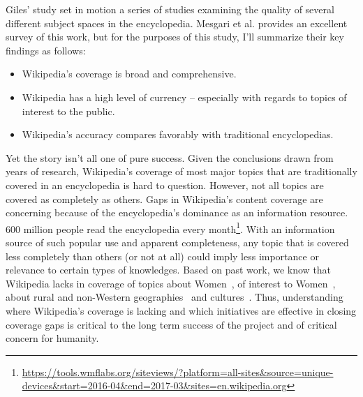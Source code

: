 Giles' study set in motion a series of studies examining the quality of several different subject spaces in the encyclopedia.  Mesgari et al. provides an excellent survey of this work\cite{mesgari15sum}, but for the purposes of this study, I'll summarize their key findings as follows:

\begin{itemize}
\item Wikipedia's coverage is broad and comprehensive.
\item Wikipedia has a high level of currency -- especially with regards to topics of interest to the public.
\item Wikipedia's accuracy compares favorably with traditional encyclopedias.
\end{itemize}

Yet the story isn't all one of pure success.  Given the conclusions drawn from years of research, Wikipedia's coverage of most major topics that are traditionally covered in an encyclopedia is hard to question.  However, not all topics are covered as completely as others.  Gaps in Wikipedia's content coverage are concerning because of the encyclopedia's dominance as an information resource.  600 million people read the encyclopedia every month\footnote{\url{https://tools.wmflabs.org/siteviews/?platform=all-sites&source=unique-devices&start=2016-04&end=2017-03&sites=en.wikipedia.org}}.  With an information source of such popular use and apparent completeness, any topic that is covered less completely than others (or not at all) could imply less importance or relevance to certain types of knowledges.  Based on past work, we know that Wikipedia lacks in coverage of topics about Women~\cite{reagle11gender}, of interest to Women~\cite{lam11clubhouse}, about rural and non-Western geographies~\cite{johnson16home,hecht09measuring} and cultures~\cite{graham14uneven}.  Thus, understanding where Wikipedia's coverage is lacking and which initiatives are effective in closing coverage gaps is critical to the long term success of the project and of critical concern for humanity.
